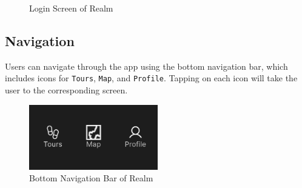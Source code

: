 \documentclass[12pt, titlepage]{article}
\newcommand{\progname}{Realm}
\begin{document}
\begin{figure}[ht!]
    \setlength{\fboxrule}{0.1mm}
    \centering
    \caption{Login Screen of \progname{}}
    \label{fig:login1}
\end{figure}

\subsection{Navigation}
Users can navigate through the app using the bottom navigation bar, which includes icons for \texttt{Tours}, \texttt{Map}, and \texttt{Profile}. Tapping on each icon will take the user to the corresponding screen.

\begin{figure}[ht!]
    \centering
    \includegraphics[width=0.5\textwidth]{nav_bar.png}
    \caption{Bottom Navigation Bar of \progname{}}
    \label{fig:nav_bar}
\end{figure}
\end{document}
